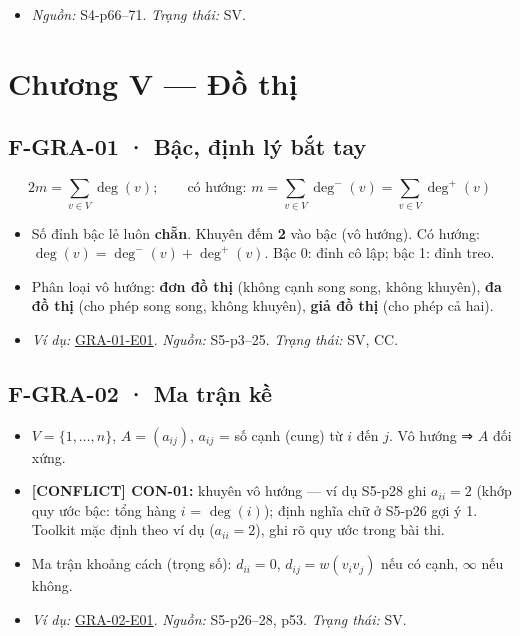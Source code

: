 \documentclass[
  10pt,
  twoside,openany]{book}
\providecommand{\tightlist}{%
  \setlength{\itemsep}{0pt}\setlength{\parskip}{0pt}}
\begin{document}
\begin{itemize}
\tightlist
\item
  \emph{Nguồn:} S4-p66--71. \emph{Trạng thái:} SV.
\end{itemize}

\hypertarget{chux1b0ux1a1ng-v-ux111ux1ed3-thux1ecb-1}{%
\section{Chương V --- Đồ
thị}\label{chux1b0ux1a1ng-v-ux111ux1ed3-thux1ecb-1}}

\hypertarget{F-GRA-01}{%
\subsection{F-GRA-01 · Bậc, định lý bắt tay}\label{F-GRA-01}}

\[
2m=\sum_{v\in V}\deg(v);\qquad\text{có hướng: } m=\sum_{v\in V}\deg^-(v)=\sum_{v\in V}\deg^+(v)
\]

\begin{itemize}
\tightlist
\item
  Số đỉnh bậc lẻ luôn \textbf{chẵn}. Khuyên đếm \textbf{2} vào bậc (vô
  hướng). Có hướng: \(\deg(v)=\deg^-(v)+\deg^+(v)\). Bậc 0: đỉnh cô lập;
  bậc 1: đỉnh treo.
\item
  Phân loại vô hướng: \textbf{đơn đồ thị} (không cạnh song song, không
  khuyên), \textbf{đa đồ thị} (cho phép song song, không khuyên),
  \textbf{giả đồ thị} (cho phép cả hai).
\item
  \emph{Ví dụ:} \protect\hyperlink{GRA-01-E01}{GRA-01-E01}.
  \emph{Nguồn:} S5-p3--25. \emph{Trạng thái:} SV, CC.
\end{itemize}

\hypertarget{F-GRA-02}{%
\subsection{F-GRA-02 · Ma trận kề}\label{F-GRA-02}}

\begin{itemize}
\tightlist
\item
  \(V=\{1,\dots,n\}\), \(A=(a_{ij})\), \(a_{ij}\) = số cạnh (cung) từ
  \(i\) đến \(j\). Vô hướng ⇒ \(A\) đối xứng.
\item
  \textbf{{[}CONFLICT{]} CON-01:} khuyên vô hướng --- ví dụ S5-p28 ghi
  \(a_{ii}=2\) (khớp quy ước bậc: tổng hàng \(i\) = \(\deg(i)\)); định
  nghĩa chữ ở S5-p26 gợi ý 1. Toolkit mặc định theo ví dụ
  (\(a_{ii}=2\)), ghi rõ quy ước trong bài thi.
\item
  Ma trận khoảng cách (trọng số): \(d_{ii}=0\), \(d_{ij}=w(v_iv_j)\) nếu
  có cạnh, \(\infty\) nếu không.
\item
  \emph{Ví dụ:} \protect\hyperlink{GRA-02-E01}{GRA-02-E01}.
  \emph{Nguồn:} S5-p26--28, p53. \emph{Trạng thái:} SV.
\end{itemize}
\end{document}
